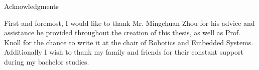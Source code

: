 \leavevmode\thispagestyle{empty}\newpage
{}
\thispagestyle{empty}

\vspace*{20mm}

\begin{center}
{ Acknowledgments}
\end{center}

\vspace{10mm}

First and foremost, I would like to thank Mr. Mingchuan Zhou for his advice and assistance he provided throughout the creation of this thesis, as well as Prof. Knoll for the chance to write it at the chair of Robotics and Embedded Systems. Additionally I wish to thank my family and friends for their constant support during my bachelor studies.
\cleardoublepage{}
